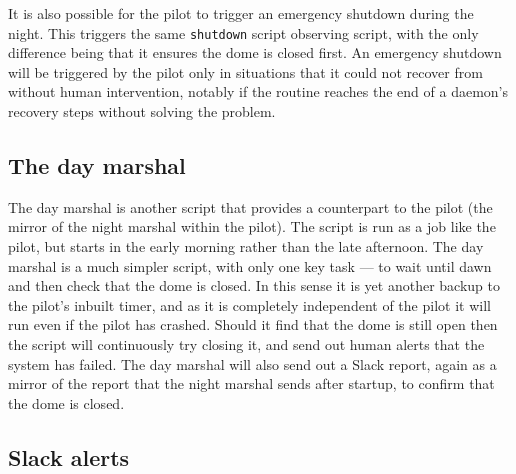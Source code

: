 \begin{colsection}
\begin{colsection}
It is also possible for the pilot to trigger an emergency shutdown during the night. This triggers the same \texttt{shutdown} script observing script, with the only difference being that it ensures the dome is closed first. An emergency shutdown will be triggered by the pilot only in situations that it could not recover from without human intervention, notably if the  routine reaches the end of a daemon's recovery steps without solving the problem.

\end{colsection}

\subsection{The day marshal}
\label{sec:day_marshal}
\begin{colsection}

The day marshal is another script that provides a counterpart to the pilot (the mirror of the night marshal within the pilot). The  script is run as a  job like the pilot, but starts in the early morning rather than the late afternoon. The day marshal is a much simpler script, with only one key task --- to wait until dawn and then check that the dome is closed. In this sense it is yet another backup to the pilot's inbuilt  timer, and as it is completely independent of the pilot it will run even if the pilot has crashed. Should it find that the dome is still open then the script will continuously try closing it, and send out human alerts that the system has failed. The day marshal will also send out a Slack report, again as a mirror of the report that the night marshal sends after startup, to confirm that the dome is closed.

\end{colsection}

\subsection{Slack alerts}
\label{sec:slack}
\begin{colsection}


\end{colsection}
\end{colsection}
